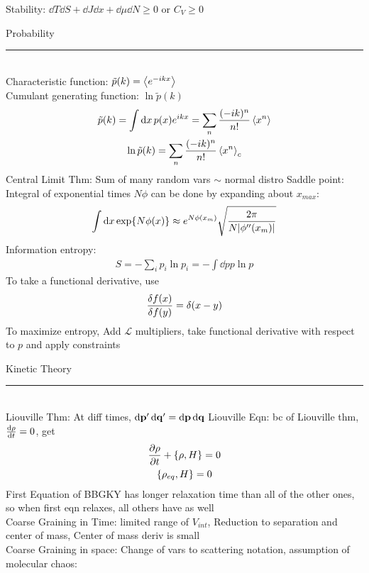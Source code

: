 \documentclass[8pt]{article}
\begin{document}
\begin{multicols*}{2}
  Stability: $\dd{T}\dd{S}+\dd{J}\dd{x}+\dd{\mu}\dd{N}\geq 0$ or $C_V\geq0$
  \begin{center}
    \large{Probability}
  \end{center}
    \hrule~\\
  Characteristic function: $\tilde{p}(k)=\ev{e^{-ikx}}$ \\
  Cumulant generating function: $\ln\tilde{p}(k)$
  \begin{gather*}
    \tilde{p}(k)=\int\dd{x}p(x)e^{ikx}=\sum_{n}\frac{(-ik)^n}{n!}\ev{x^n}\\
    \ln\tilde{p}(k)=\sum_n\frac{(-ik)^n}{n!}\ev{x^n}_c
  \end{gather*}
  Central Limit Thm: Sum of many random vars $\sim$ normal distro
  Saddle point: Integral of exponential times $N\phi$ can be done by expanding about $x_{max}$:
  \begin{align*}
    \int\dd{x}\exp{N\phi(x)}\approx e^{N\phi(x_{m})}
    \sqrt{\frac{2\pi}{N\abs{\phi''(x_{m})}}}
  \end{align*}
  Information entropy:
  \begin{align*}
    S=-\sum_ip_i\ln p_i=-\int\dd{p}p\ln p
  \end{align*}
  To take a functional derivative, use
  \begin{gather*}
    \fdv{f(x)}{f(y)}=\delta(x-y)
  \end{gather*}
  To maximize entropy, Add $\mathcal{L}$ multipliers, take functional derivative with respect to $p$ and apply constraints
  \begin{center}
    \large{Kinetic Theory}
  \end{center}
    \hrule~\\
  Liouville Thm: At diff times, $\dd{\vb{p}'}\dd{\vb{q}'}=\dd{\vb{p}}\dd{\vb{q}}$
  Liouville Eqn: bc of Liouville thm, $\dv{\rho}{t}=0$, get
  \begin{gather*}
    \pdv{\rho}{t}+\{\rho,H\}=0\\
    \{\rho_{eq},H\}=0
  \end{gather*}
  First Equation of BBGKY has longer relaxation time than all of the other ones, so when first eqn relaxes, all others have as well\\
  Coarse Graining in Time: limited range of $V_{int}$, Reduction to separation and center of mass, Center of mass deriv is small \\
  Coarse Graining in space: Change of vars to scattering notation, assumption of molecular chaos:
  \begin{gather*}

\end{gather*}
\end{multicols*}
\end{document}
